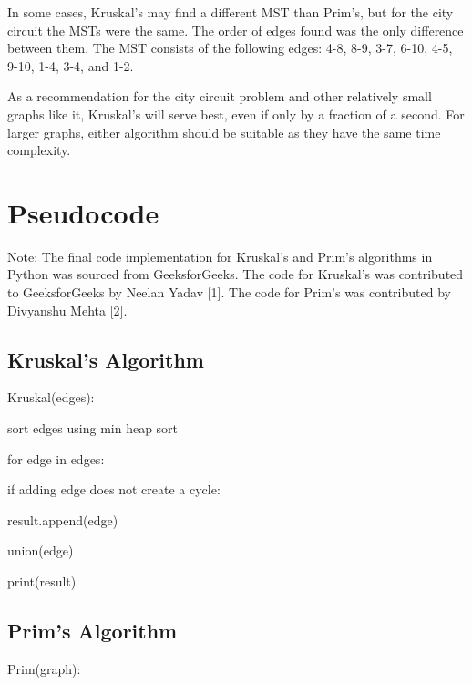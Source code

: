\documentclass{article}
\begin{document}
In some cases, Kruskal's may find a different MST than Prim's, but for the city circuit the MSTs were the same. The order of edges found was the only difference between them. The MST consists of the following edges: 4-8, 8-9, 3-7, 6-10, 4-5, 9-10, 1-4, 3-4, and 1-2.

As a recommendation for the city circuit problem and other relatively small graphs like it, Kruskal's will serve best, even if only by a fraction of a second. For larger graphs, either algorithm should be suitable as they have the same time complexity.

\newpage
\section{Pseudocode}
Note: The final code implementation for Kruskal's and Prim's algorithms in Python was sourced from GeeksforGeeks. The code for Kruskal's was contributed to GeeksforGeeks by Neelan Yadav [1]. The code for Prim's was contributed by Divyanshu Mehta [2].
\subsection{Kruskal's Algorithm}
\hspace{\parindent}Kruskal(edges):

\hspace{\parindent}sort edges using min heap sort

\hspace{\parindent}for edge in edges:

\hspace{\parindent}\hspace{\parindent}if adding edge does not create a cycle:

\hspace{\parindent}\hspace{\parindent}\hspace{\parindent}result.append(edge)

\hspace{\parindent}\hspace{\parindent}\hspace{\parindent}union(edge)

\hspace{\parindent}print(result)

\subsection{Prim's Algorithm}
\hspace{\parindent}Prim(graph):
\end{document}
